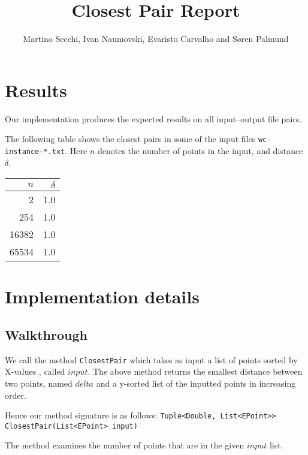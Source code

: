 \documentclass{tufte-handout}
\title{Closest Pair Report}
\author{Martino Secchi, Ivan Naumovski, Evaristo Carvalho and Søren Palmund}
\begin{document}
\maketitle

  \section{Results}

  Our implementation produces the expected results on all input--output file pairs.

  The following table shows the closest pairs in some of the input files {\tt wc-instance-*.txt}.
  Here $n$ denotes the number of points in the input,
  and distance $\delta$.

  \bigskip\noindent
  \begin{tabular}{rr}\toprule
    $n$ & $\delta$ \\\midrule
    2 & 1.0 \\
    254 & 1.0 \\
    16382 & 1.0 \\
    65534 & 1.0 \\\bottomrule
  \end{tabular}


  \section{Implementation details}
    
  \subsection{Walkthrough}
  
  We call the method \verb+ClosestPair+ which takes as input a list of points sorted by X-values , called $input$. The above method returns the smallest distance between two points, named $delta$ and a y-sorted list of the inputted points in increasing order. \newline

Hence our method signature is as follows: \newline
 \verb+Tuple<Double, List<EPoint>> ClosestPair(List<EPoint> input)+
  
 The method examines the number of points that are in the given $input$ list.\newline
\end{document}
